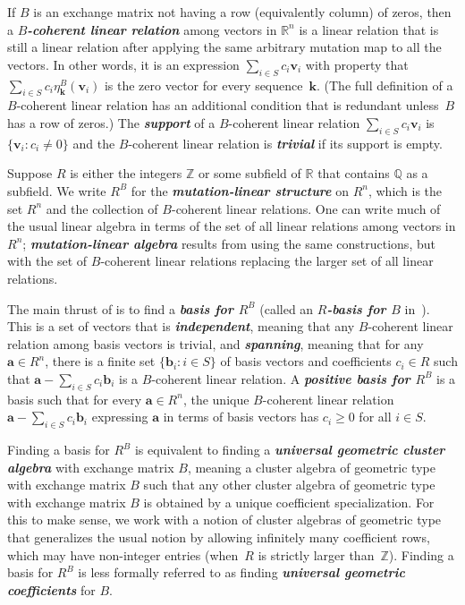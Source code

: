 \documentclass{amsart}
\theoremstyle{definition}
\theoremstyle{remark}
\numberwithin{equation}{section}
\newcommand{\newword}[1]{\textbf{\emph{#1}}}
\newcommand{\integers}{\mathbb Z}
\newcommand{\rationals}{\mathbb Q}
\newcommand{\reals}{\mathbb R}
\newcommand{\set}[1]{{\lbrace #1 \rbrace}}
\newcommand{\0}{{\mathbf{0}}}
\renewcommand{\b}{\mathbf{b}}
\newcommand{\kk}{{\boldsymbol{k}}}
\renewcommand{\a}{\mathbf{a}}
\renewcommand{\v}{\mathbf{v}}
\begin{document}
If $B$ is an exchange matrix not having a row (equivalently column) of zeros, then a \newword{$B$-coherent linear relation} among vectors in $\reals^n$ is a linear relation that is still a linear relation after applying the same arbitrary mutation map to all the vectors.
In other words, it is an expression $\sum_{i\in S}c_i\v_i$ with property that $\sum_{i\in S}c_i\eta_\kk^B(\v_i)$ is the zero vector for every sequence~$\kk$.
(The full definition of a $B$-coherent linear relation \cite[Definition~4.2]{universal} has an additional condition that is redundant unless~$B$ has a row of zeros.)
The \newword{support} of a $B$-coherent linear relation $\sum_{i\in S}c_i\v_i$ is $\set{\v_i:c_i\neq0}$ and the $B$-coherent linear relation is \newword{trivial} if its support is empty.

Suppose $R$ is either the integers $\integers$ or some subfield of $\reals$ that contains $\rationals$ as a subfield.
We write $R^B$ for the \newword{mutation-linear structure} on $R^n$, which is the set $R^n$ and the collection of $B$-coherent linear relations.
One can write much of the usual linear algebra in terms of the set of all linear relations among vectors in $R^n$;
\newword{mutation-linear algebra} results from using the same constructions, but with the set of $B$-coherent linear relations replacing the larger set of all linear relations.

The main thrust of \cite{universal} is to find a \newword{basis for $R^B$} (called an \newword{$R$-basis for $B$} in~\cite{universal}).
This is a set of vectors that is \newword{independent}, meaning that any $B$-coherent linear relation among basis vectors is trivial, and \newword{spanning}, meaning that for any $\a\in R^n$, there is a finite set $\set{\b_i:i\in S}$ of basis vectors and coefficients $c_i\in R$ such that $\a-\sum_{i\in S}c_i\b_i$ is a $B$-coherent linear relation.
A \newword{positive basis for $R^B$} is a basis such that for every $\a\in R^n$, the unique $B$-coherent linear relation $\a-\sum_{i\in S}c_i\b_i$ expressing $\a$ in terms of basis vectors has $c_i\ge0$ for all $i\in S$.

Finding a basis for $R^B$ is equivalent \cite[Theorem~4.4]{universal} to finding a \newword{universal geometric cluster algebra} with exchange matrix $B$, meaning a cluster algebra of geometric type with exchange matrix $B$ such that any other cluster algebra of geometric type with exchange matrix $B$ is obtained by a unique coefficient specialization.
For this to make sense, we work with a notion of cluster algebras of geometric type \cite[Section~2]{universal} that generalizes the usual notion \cite[Section~2]{ca4} by allowing infinitely many coefficient rows, which may have non-integer entries (when~$R$ is strictly larger than~$\integers$).
Finding a basis for $R^B$ is less formally referred to as finding \newword{universal geometric coefficients} for $B$.
\end{document}

